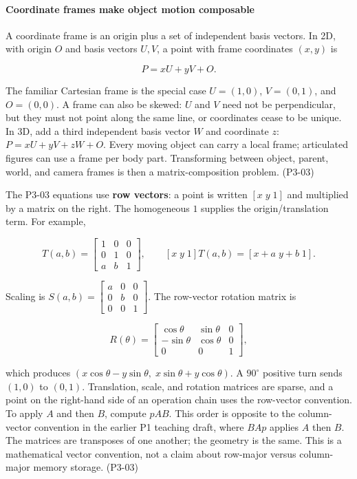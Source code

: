 \paragraph{Coordinate frames make object motion composable}\label{03-visual-computing-i-ch001-coordinate-frames-make-object-motion-composable}

\hypertarget{03-visual-computing-i-ch001-coordinate-frames-make-object-motion-composable}{}

A coordinate frame is an origin plus a set of independent basis vectors. In 2D, with origin \(O\) and basis vectors \(U,V\), a point with frame coordinates \((x,y)\) is

\[
P=xU+yV+O.
\]

The familiar Cartesian frame is the special case \(U=(1,0)\), \(V=(0,1)\), and \(O=(0,0)\). A frame can also be skewed: \(U\) and \(V\) need not be perpendicular, but they must not point along the same line, or coordinates cease to be unique. In 3D, add a third independent basis vector \(W\) and coordinate \(z\): \(P=xU+yV+zW+O\). Every moving object can carry a local frame; articulated figures can use a frame per body part. Transforming between object, parent, world, and camera frames is then a matrix-composition problem. (P3-03)

The P3-03 equations use \textbf{row vectors}: a point is written \([x\;y\;1]\) and multiplied by a matrix on the right. The homogeneous \(1\) supplies the origin/translation term. For example,

\[
T(a,b)=\begin{bmatrix}1&0&0\\0&1&0\\a&b&1\end{bmatrix},\qquad
[x\;y\;1]T(a,b)=[x+a\;y+b\;1].
\]

Scaling is \(S(a,b)=\begin{bmatrix}a&0&0\\0&b&0\\0&0&1\end{bmatrix}\). The row-vector rotation matrix is

\[
R(\theta)=\begin{bmatrix}\cos\theta&\sin\theta&0\\-\sin\theta&\cos\theta&0\\0&0&1\end{bmatrix},
\]

which produces \((x\cos\theta-y\sin\theta,\;x\sin\theta+y\cos\theta)\). A \(90^\circ\) positive turn sends \((1,0)\) to \((0,1)\). Translation, scale, and rotation matrices are sparse, and a point on the right-hand side of an operation chain uses the row-vector convention. To apply \(A\) and then \(B\), compute \(pAB\). This order is opposite to the column-vector convention in the earlier P1 teaching draft, where \(BAp\) applies \(A\) then \(B\). The matrices are transposes of one another; the geometry is the same. This is a mathematical vector convention, not a claim about row-major versus column-major memory storage. (P3-03)

